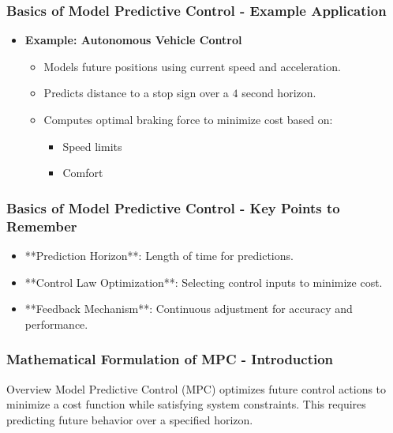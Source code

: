 \documentclass[aspectratio=169]{beamer}
\begin{document}
\begin{frame}[fragile]
    \frametitle{Basics of Model Predictive Control - Example Application}
    \begin{itemize}
        \item \textbf{Example: Autonomous Vehicle Control}
        \begin{itemize}
            \item Models future positions using current speed and acceleration.
            \item Predicts distance to a stop sign over a \(4\) second horizon.
            \item Computes optimal braking force to minimize cost based on:
            \begin{itemize}
                \item Speed limits
                \item Comfort
            \end{itemize}
        \end{itemize}
    \end{itemize}
\end{frame}

\begin{frame}[fragile]
    \frametitle{Basics of Model Predictive Control - Key Points to Remember}
    \begin{itemize}
        \item **Prediction Horizon**: Length of time for predictions.
        \item **Control Law Optimization**: Selecting control inputs to minimize cost.
        \item **Feedback Mechanism**: Continuous adjustment for accuracy and performance.
    \end{itemize}
\end{frame}

\begin{frame}[fragile]
    \frametitle{Mathematical Formulation of MPC - Introduction}
    \begin{block}{Overview}
        Model Predictive Control (MPC) optimizes future control actions to minimize a cost function while satisfying system constraints. This requires predicting future behavior over a specified horizon.
    \end{block}
\end{frame}
\end{document}
